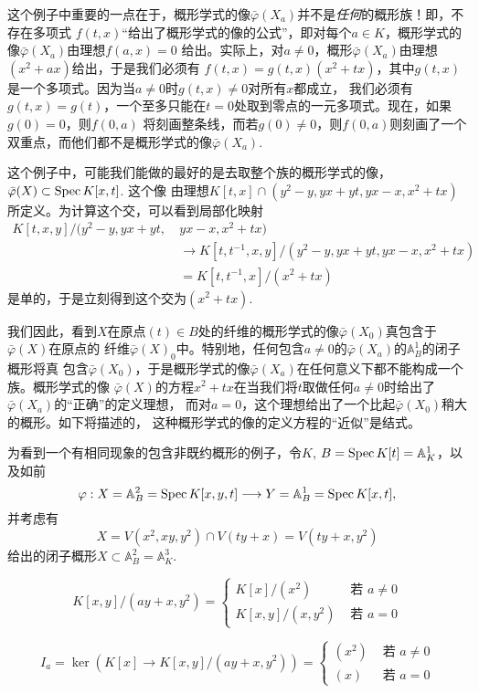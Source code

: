这个例子中重要的一点在于，概形学式的像$\bar\varphi(X_a)$并不是\textit{任何}的概形族！即，不存在多项式
$f(t,x)$“给出了概形学式的像的公式”，即对每个$a\in K$，概形学式的像$\bar\varphi(X_a)$由理想$f(a,x)=0$
给出。实际上，对$a\neq 0$，概形$\bar\varphi(X_a)$由理想$(x^2+ax)$给出，于是我们必须有
$f(t,x)=g(t,x)(x^2+tx)$，其中$g(t,x)$是一个多项式。因为当$a\neq 0$时$g(t,x)\neq 0$对所有$x$都成立，
我们必须有$g(t,x)=g(t)$，一个至多只能在$t=0$处取到零点的一元多项式。现在，如果$g(0)=0$，则$f(0,a)$
将刻画整条线，而若$g(0)\neq 0$，则$f(0,a)$则刻画了一个双重点，而他们都不是概形学式的像$\bar\varphi(X_a)$.

这个例子中，可能我们能做的最好的是去取整个族的概形学式的像，$\bar\varphi(X)\subset \operatorname{Spec} K[x,t]$. 这个像
由理想$K[t, x] \cap\left(y^2-y, y x+y t, y x-x, x^2+t x\right)$所定义。为计算这个交，可以看到局部化映射
\[
    \begin{aligned}
        K[t, x, y] /(y^2-y, y x+ y t, ~& y x-x, x^2+t x) \\
        & \to K[t, t^{-1}, x, y] /(y^2-y, y x+y t, y x-x, x^2+t x) \\
        & =K[t, t^{-1}, x] /(x^2+t x)
    \end{aligned}
\]
是单的，于是立刻得到这个交为$(x^2+tx)$.

我们因此，看到$X$在原点$(t)\in B$处的纤维的概形学式的像$\bar\varphi(X_0)$真包含于$\bar\varphi(X)$在原点的
纤维$\bar\varphi(X)_0$中。特别地，任何包含$a\neq 0$的$\bar\varphi(X_a)$的$\mathbb A_B^1$的闭子概形将真
包含$\bar\varphi(X_0)$，于是概形学式的像$\bar\varphi(X_a)$在任何意义下都不能构成一个族。概形学式的像
$\bar\varphi(X)$的方程$x^2+tx$在当我们将$t$取做任何$a\neq 0$时给出了$\bar\varphi(X_a)$的“正确”的定义理想，
而对$a=0$，这个理想给出了一个比起$\bar\varphi(X_0)$稍大的概形。如下将描述的，
这种概形学式的像的定义方程的“近似”是结式。

\begin{exa}\label{exa:5.7}
为看到一个有相同现象的包含非既约概形的例子，令$K$, $B=\operatorname{Spec} K[t]=\mathbb A_K^1$，以及如前
\[
    \varphi: X=\mathbb{A}_B^2=\operatorname{Spec} K[x, y, t] \longrightarrow Y=\mathbb{A}_B^1=\operatorname{Spec} K[x, t],
\]
并考虑有
\[
    X=V\left(x^2, x y, y^2\right) \cap V(t y+x)=V\left(t y+x, y^2\right)
\]
给出的闭子概形$X\subset \mathbb A_B^2=\mathbb A_K^3$. 

\nottran



\[
    K[x, y] /\left(a y+x, y^2\right)= 
    \begin{cases}K[x] /\left(x^2\right) & \text { 若 } a \neq 0 \\ 
        K[x, y] /\left(x, y^2\right) & \text { 若 } a=0\end{cases}
\]

\[
    I_a=\ker\left(K[x] \rightarrow K[x, y] /\left(a y+x, y^2\right)\right)= 
    \begin{cases}\left(x^2\right) & \text { 若 } a \neq 0 \\ 
        (x) & \text { 若 } a=0\end{cases}
\]

\end{exa}

